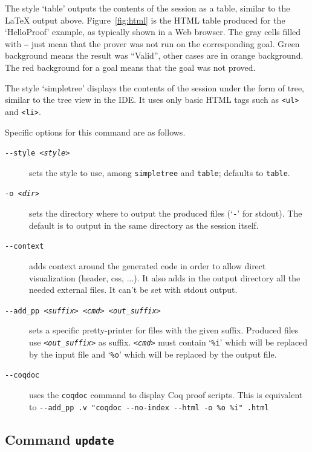 The style `table' outputs the contents of the session as a table,
similar to the LaTeX output above. Figure~\ref{fig:html} is the HTML
table produced for the `HelloProof' example, as typically shown in a
Web browser. The gray cells filled with \texttt{---} just mean that
the prover was not run on the corresponding goal. Green background
means the result was ``Valid'', other cases are in orange
background. The red background for a goal means that the goal was not
proved.

The style `simpletree' displays the contents of the session under the
form of tree, similar to the tree view in the IDE. It uses only basic
HTML tags such as \verb|<ul>| and \verb|<li>|.

Specific options for this command are as follows.
\begin{description}
\item[\texttt{-{}-style \textsl{<style>}}] sets the style to use, among
  \texttt{simpletree} and \texttt{table}; defaults to
  \texttt{table}.

\item[\texttt{-o \textsl{<dir>}}] sets the directory where to output
  the produced files (`\texttt{-}' for stdout). The default is to output
  in the same directory as the session itself.

\item[\texttt{-{}-context}] adds context around the generated code in
  order to allow direct visualization (header, css, ...). It also adds
  in the output directory all the needed external files. It can't be set with
  stdout output.

\item[\texttt{-{}-add\_pp \textsl{<suffix>} \textsl{<cmd>} \textsl{<out\_suffix>}}] sets a specific
  pretty-printer for files with the given suffix. Produced files use
  \texttt{\textsl{<out\_suffix>}} as suffix. \texttt{\textsl{<cmd>}} must contain
  `\texttt{\%i}' which will be replaced by the input file and
  `\texttt{\%o}' which will be replaced by the output file.

\item[\texttt{-{}-coqdoc}] uses the \verb|coqdoc| command to display Coq proof
  scripts. This is equivalent to \texttt{-{}-add\_pp .v "coqdoc
    -{}-no-index -{}-html -o \%o \%i" .html}

\end{description}



\subsection{Command \texttt{update}}

